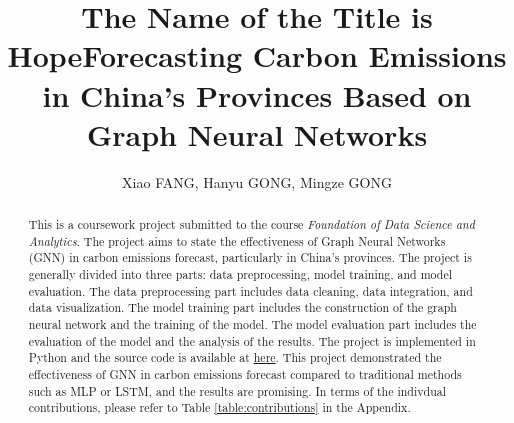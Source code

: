 \documentclass[sigconf, authordraft]{acmart}
\begin{document}
\title{The Name of the Title is Hope}
\title{Forecasting Carbon Emissions in China's Provinces Based on Graph Neural Networks}



\author{Xiao FANG, Hanyu GONG, Mingze GONG}


\renewcommand{\shortauthors}{Xiao, Hanyu \& Mingze}


\begin{abstract}
	This is a coursework project submitted to the course \textit{Foundation of Data
		Science and Analytics}. The project aims to state the effectiveness of Graph
	Neural Networks (GNN) in carbon emissions forecast, particularly in China's
	provinces. The project is generally divided into three parts: data
	preprocessing, model training, and model evaluation. The data preprocessing part
	includes data cleaning, data integration, and data visualization. The model
	training part includes the construction of the graph neural network and the
	training of the model. The model evaluation part includes the evaluation of the
	model and the analysis of the results. The project is implemented in Python
	and the source code is available at
	\href{https://github.com/palaceparis/DSAA5020_Group_Project}{here}. This project
	demonstrated the effectiveness of GNN in carbon emissions forecast compared to
	traditional methods such as MLP or LSTM, and the results are promising. In terms
	of the indivdual contributions, please refer to Table \ref{table:contributions} in the Appendix.
\end{abstract}

\end{document}
